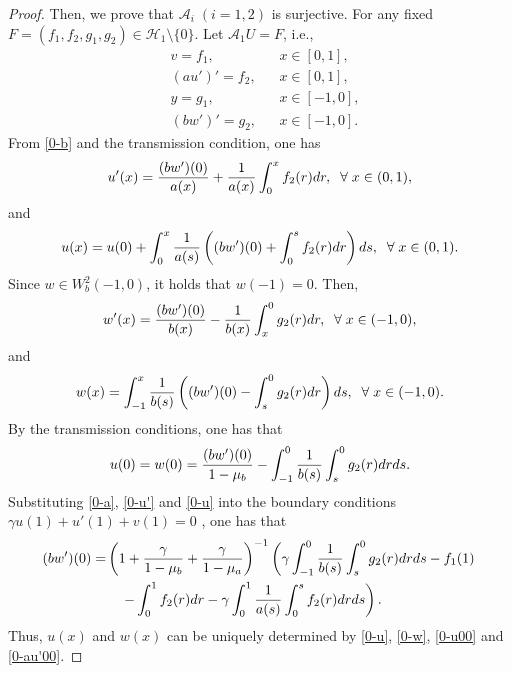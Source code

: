 \documentclass[twoside]{article}
\theoremstyle{noparens}
\theoremstyle{definition}
\numberwithin{equation}{section}
\numberwithin{figure}{section}
\begin{document}
\begin{proof}
Then, we prove that $\mathcal A_i\;(i=1,2)$ is surjective. For any fixed $F= (f_1,f_2,g_1,g_2)\in \mathcal H_1\setminus\{0\}$. Let $\mathcal A_1U = F$, i.e.,
\begin{subequations}
	\begin{align}
		&v=f_1,&&x\in[0,1],\label{0-a}\\
		&(au')'=f_2,&&x\in[0,1],\label{0-b}\\
		&y=g_1,&&x\in[-1,0],\label{0-c}\\
		&(bw')'= g_2,&&x\in[-1,0].\label{0-d}
	\end{align}
\end{subequations}
From \eqref{0-b} and the transmission condition, one has
\begin{equation}\label{0-u'}
	u'(x)={(bw')(0)\over a(x)}+{1\over a(x)}\int_0^x f_2(r)dr,\;\;\forall\;x\in(0,1),
\end{equation}
and
\begin{equation}\label{0-u}
	u(x) = u(0) + \int_0^x {1\over a(s)}\left((bw')(0)+\int_0^s f_2(r)dr\right) ds,\;\;\forall\;x\in(0,1).
\end{equation}
Since $w\in W_b^2(-1,0)$, it holds that $w(-1) =0$. Then,
\begin{equation}\label{0-w'}
	w'(x) = {(bw')(0)\over b(x)} - {1\over b(x)}\int_x^0 g_2(r)dr,\;\;\forall\;x\in(-1,0),
\end{equation}
and
\begin{equation}\label{0-w}
	w(x) = \int_{-1}^x {1\over b(s)} \left( (bw')(0)  -  \int_s^0 g_2(r)dr\right) ds,\;\;\forall\;x\in(-1,0).
\end{equation}
By the transmission conditions, one has that
\begin{equation}\label{0-u00}
	u(0) = w(0) = {(bw')(0)\over 1-\mu_b} - \int_{-1}^0{1\over b(s)} \int_s^0 g_2(r)dr ds.
\end{equation}
Substituting \eqref{0-a}, \eqref{0-u'} and \eqref{0-u} into the boundary conditions $\gamma u(1) + u'(1) +v(1) =0$ , one has that
\begin{equation}\label{0-au'00}
	\begin{split}
		(bw')(0) = &\left(1 + {\gamma\over1-\mu_b}+{\gamma\over1-\mu_a}\right)^{-1}
		\left(\gamma\int_{-1}^0 {1\over b(s)}\int_s^0 g_2(r) dr ds - f_1(1)\right.\\
		&\left.\quad-\int_0^1 f_2(r)dr
		- \gamma\int_0^1{1\over a(s)}\int_0^sf_2(r)dr ds \right).
	\end{split}
\end{equation}
Thus, $u(x)$ and $w(x)$ can be uniquely determined by \eqref{0-u}, \eqref{0-w}, \eqref{0-u00} and \eqref{0-au'00}.


\end{proof}
\end{document}
